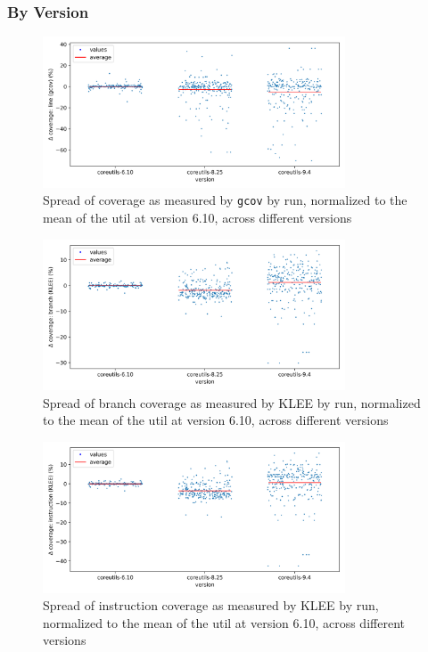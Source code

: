 \documentclass{article}
\begin{document}
\clearpage
\subsubsection{By Version}

\begin{figure}[htbp]
    \centering
    \includegraphics[width=0.8\textwidth]{../plots/gcov_cov/changes-by-version.png}
    \captionsetup{width=0.6\textwidth}
    \caption{Spread of coverage as measured by \lstinline{gcov} by run, normalized to the mean of the util at version 6.10, across different versions}
\end{figure}
\begin{figure}[htbp]
    \centering
    \includegraphics[width=0.8\textwidth]{../plots/klee_BCov/changes-by-version.png}
    \captionsetup{width=0.6\textwidth}
    \caption{Spread of branch coverage as measured by KLEE by run, normalized to the mean of the util at version 6.10, across different versions}
\end{figure}
\begin{figure}[htbp]
    \centering
    \includegraphics[width=0.8\textwidth]{../plots/klee_ICov/changes-by-version.png}
    \captionsetup{width=0.6\textwidth}
    \caption{Spread of instruction coverage as measured by KLEE by run, normalized to the mean of the util at version 6.10, across different versions}
\end{figure}
\end{document}

